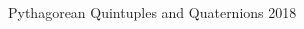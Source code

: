 \documentclass[12pt,table]{article}
\theoremstyle{definition}
\theoremstyle{remark}
\numberwithin{equation}{section}
\begin{document}
\begin{thebibliography}{1}

\begin{comment}

\bibitem{Baez}
\journal{J.\ C.\ Baez}
        {Review of ``On Quaternions and Octonions: 
         Their Geometry, Arithmetic and Symmetry''}
        {Bull.\ Amer.\ Math.\ Soc.}{42}{2005}{229--243}
        


\bibitem{Barning}
\journal{F.\  J.\  M.\  Barning} 
      {On Pythagorean and quasi-Pythagorean triangles and a
      generation process with the help of unimodular matrices (Dutch)}
      {Math.\ Centrum Amsterdam Afd.\ Zuivere Wisk.}
      {ZW-011}{1963}{37 pp}



\bibitem{Berggren}
\journal{B.\ Berggren} 
        {Pytagoreiska trianglar (Swedish)} 
        {Elementa: Tidskrift f\"or element\"ar
        matematik, fysik och kemi.}
        {17}{1934}{129--139}

\bibitem{Conrad}
\journal{K.\ Conrad}
        {Pythagorean descent}
        {}
        {}{Preprint}{1-9}



\bibitem{Conway_and_Smith}
\book{J.\ Conway and D.\ Smith}
     {On Quaternions and Octonions: 
      Their Geometry, Arithmetic and Symmetry}
     {A K Peters, Ltd., Natick MA}
     {2003}


\bibitem{Davidoff_Sarnak_Valette}
\book{G.\ Davidoff, P.\ Sarnak, and A.\ Valette}
         {Elementary Number Theory,
           Group Theory,
           and Ramanujan Graphs}
         {Cambridge University Press}
         {2003}

\bibitem{Dickson}
\book{L.\ E.\ Dickson}
         {History of the Theory of Numbers}
         {AMS Chelsea Publishing}
         {1999}

\end{comment}


        {Pythagorean Quintuples and Quaternions}
        {2018}

\begin{comment}


\bibitem{Ferrari}
\journal{F.\ Ferrari}
        {Risoluzione Dell'Equazione}
        {Supplemento al Periodico di Matematica}
        {11}{1908}{129--131}



\bibitem{Frisch_and_Vaserstein}
\journal{S.\ Frisch and L.\ Vaserstein}
       {Polynomial parametrization of Pythagorean quadruples,
        quintuples and sextuples}
       {J.\ Pure Appl.\ Algebra}{216}{2012}{184--191}



\end{comment}
\end{thebibliography}
\end{document}
